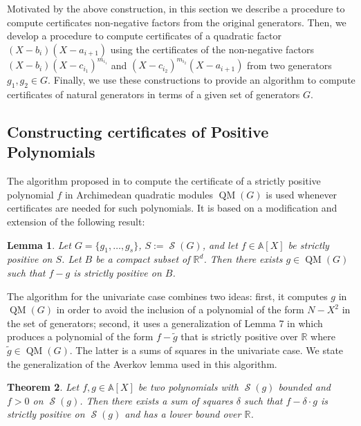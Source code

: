 \documentclass[preprint,12pt,authoryear]{elsarticle}
\newtheorem{theorem}{Theorem}[section]
\newtheorem{lemma}[theorem]{Lemma}
\newcommand{\aX}{\mathbb{A}[X]}
\DeclareMathOperator{\quadmod}{QM}
\DeclareMathOperator{\semialgebraic}{\mathcal{S}}
\begin{document}
Motivated by the above construction, in this section we describe a procedure
to compute certificates non-negative factors from the original generators. Then,
we develop a procedure to compute certificates of a quadratic factor
$(X - b_i)(X - a_{i+1})$ using the certificates of the non-negative factors
$(X - b_i)(X - c_{i_1})^{m_{i_1}}$ and $(X - c_{i_2})^{m_{i_2}}(X - a_{i+1})$
from two generators $g_1, g_2 \in G$. Finally, we use these constructions to
provide an algorithm to compute certificates of natural generators in terms of a
given set of generators $G$.
\vspace{-6mm}

\subsection{Constructing certificates of Positive Polynomials}
\label{sec:results--10}

The algorithm proposed in \cite{weifeng2025} to compute the certificate of a
strictly positive polynomial $f$ in Archimedean quadratic modules $\quadmod(G)$
is used whenever certificates are needed for such polynomials. It is based on
a modification and extension of the following result:

\begin{lemma}\cite[Lemma 7][Page 4]{10.1007/s10957-012-0261-9}
  \th\label{lemma_7_averkov}
  Let $G = \{g_1, \dots, g_s\}$, $S := \semialgebraic(G)$, and let $f \in \aX$
  be strictly positive on $S$. Let $B$ be a compact subset of
  $\mathbb{R}^{d}$. Then there exists $g \in \quadmod(G)$ such that $f - g$ is
  strictly positive on $B$.
\end{lemma}

The algorithm for the univariate case combines two ideas: first, it computes $g$
in $\quadmod(G)$ in order to avoid the inclusion of a polynomial of the form
$N - X^{2}$ in the set of generators; second, it uses a generalization of Lemma
7 in \cite{10.1007/s10957-012-0261-9} which produces a polynomial of the form
$f - \tilde{g}$ that is strictly positive over $\mathbb{R}$ where
$\tilde{g} \in \quadmod(G)$. The latter is a sums of squares in the univariate
case. We state the generalization of the Averkov lemma used in this algorithm.

\begin{theorem} \cite[Proposition 5.1]{weifeng2025} Let $f, g \in \aX$ be two
  polynomials with $\semialgebraic(g)$ bounded and $ f > 0 $ on
  $\semialgebraic(g)$. Then there exists a sum of squares $\delta$ such that
  $f - \delta \cdot g$ is strictly positive on $\semialgebraic(g)$ and has a
  lower bound over $\mathbb{R}$.
\end{theorem}
\end{document}
